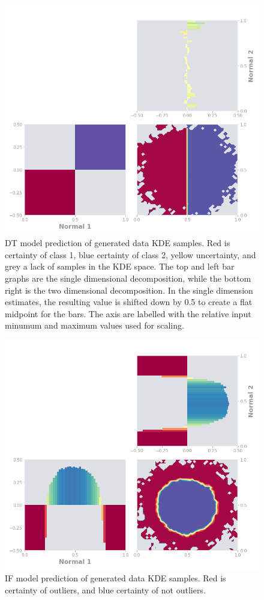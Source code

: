 \documentclass[a4paper, oneside, twocolumn]{article}
\begin{document}
\begin{figure}
\centering
\includegraphics[width=0.8\columnwidth]{img/gen_dt.png}
\caption{DT model prediction of generated data KDE samples. Red is certainty of class 1, blue certainty of class 2, yellow uncertainty, and grey a lack of samples in the KDE space. The top and left bar graphs are the single dimensional decomposition, while the bottom right is the two dimensional decomposition. In the single dimension estimates, the resulting value is shifted down by 0.5 to create a flat midpoint for the bars. The axis are labelled with the relative input minumum and maximum values used for scaling.}
\label{fig:gen-dt}
\end{figure}

\begin{figure}
\centering
\includegraphics[width=0.8\columnwidth]{img/gen_if.png}
\caption{IF model prediction of generated data KDE samples. Red is certainty of outliers, and blue certainty of not outliers.}
\label{fig:gen-if}
\end{figure}
\end{document}

